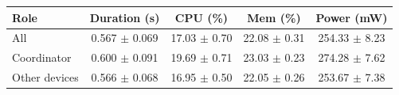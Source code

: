 \begin{tabular}{lcccc}
\hline
\textbf{Role} & \textbf{Duration (s)} & \textbf{CPU (\%)} & \textbf{Mem (\%)} & \textbf{Power (mW)} \\
\hline
All & 0.567 $\pm$ 0.069 & 17.03 $\pm$ 0.70 & 22.08 $\pm$ 0.31 & 254.33 $\pm$ 8.23 \\
Coordinator & 0.600 $\pm$ 0.091 & 19.69 $\pm$ 0.71 & 23.03 $\pm$ 0.23 & 274.28 $\pm$ 7.62 \\
Other devices & 0.566 $\pm$ 0.068 & 16.95 $\pm$ 0.50 & 22.05 $\pm$ 0.26 & 253.67 $\pm$ 7.38 \\
\hline
\end{tabular}
